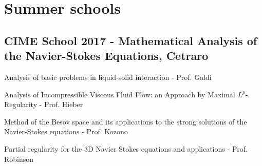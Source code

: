 \documentclass{article}
\begin{document}
\section{Summer schools}

\subsection{CIME School 2017  - Mathematical Analysis of the Navier-Stokes Equations, Cetraro}

\begin{outline}[enumerate]

\1 Analysis of basic problems in liquid-solid interaction - Prof. Galdi

\1 Analysis of Incompressible Viscous Fluid Flow: an Approach by Maximal $L^p$-Regularity - Prof. Hieber

\1 Method of the Besov space and its applications to the strong solutions of the Navier-Stokes equations - Prof. Kozono

\1 Partial regularity for the 3D Navier Stokes equations and applications - Prof. Robinson

\end{outline}

\nocite{*}


\end{document}
